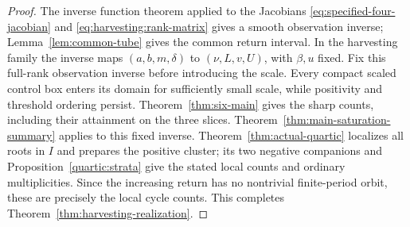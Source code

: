\begin{proof}
The inverse function theorem applied to the Jacobians
\eqref{eq:specified-four-jacobian} and \eqref{eq:harvesting:rank-matrix}
gives a smooth observation inverse; Lemma~\ref{lem:common-tube}
gives the common return interval. In the harvesting family the inverse maps
\((a,b,m,\delta)\) to \((\nu,L,v,U)\), with \(\beta,u\) fixed.
Fix this full-rank observation inverse before introducing the scale.
Every compact scaled control box enters its domain for sufficiently small
scale, while positivity and threshold ordering persist.
Theorem~\ref{thm:six-main} gives the sharp counts, including their
attainment on the three slices. Theorem~\ref{thm:main-saturation-summary}
applies to this fixed inverse. Theorem~\ref{thm:actual-quartic} localizes
all roots in \(I\) and prepares the positive cluster; its two negative
companions and Proposition~\ref{quartic:strata} give the stated local counts
and ordinary multiplicities.
Since the increasing return has no nontrivial finite-period orbit, these
are precisely the local cycle counts. This completes
Theorem~\ref{thm:harvesting-realization}.
\end{proof}
